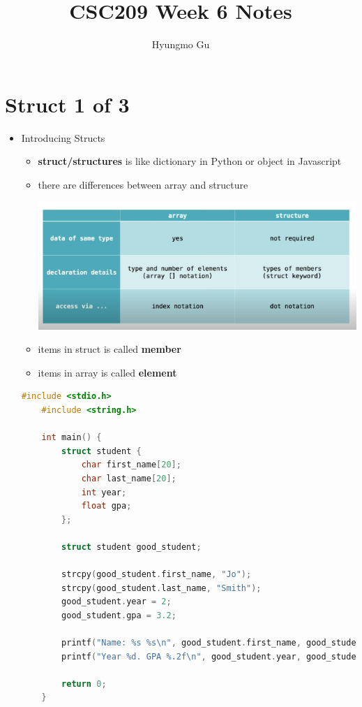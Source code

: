 \documentclass[12pt]{article}
\begin{document}
\title{CSC209 Week 6 Notes}
\author{Hyungmo Gu}
\maketitle

\section*{Struct 1 of 3}

\bigskip

\begin{itemize}
    \item Introducing Structs
    \begin{itemize}
        \item \textbf{struct/structures} is like dictionary in Python or object in Javascript
        \item there are differences between array and structure

        \begin{center}
        \includegraphics[width=\linewidth]{images/week_6_structs_1_1.png}
        \end{center}

        \item items in struct is called \textbf{member}
        \item items in array is called \textbf{element}
    \end{itemize}

    \bigskip

    \begin{lstlisting}[language=c,caption={struct\_example\_1.c}]
    #include <stdio.h>
    #include <string.h>

    int main() {
        struct student {
            char first_name[20];
            char last_name[20];
            int year;
            float gpa;
        };

        struct student good_student;

        strcpy(good_student.first_name, "Jo");
        strcpy(good_student.last_name, "Smith");
        good_student.year = 2;
        good_student.gpa = 3.2;

        printf("Name: %s %s\n", good_student.first_name, good_student.last_name);
        printf("Year %d. GPA %.2f\n", good_student.year, good_student.gpa);

        return 0;
    }
    \end{lstlisting}
\end{itemize}
\end{document}
